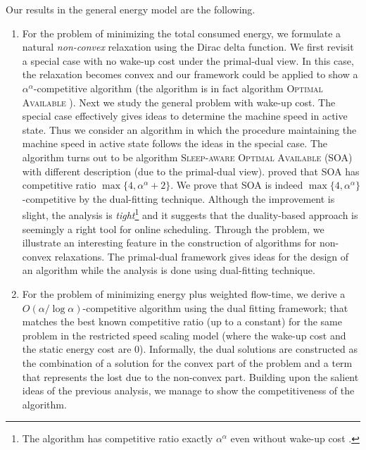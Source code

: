 \documentclass[11pt]{article}
\begin{document}
Our results in the general energy model are the following.


\begin{enumerate}
	\item For the problem of minimizing the total consumed energy,
	we formulate a natural \emph{non-convex} relaxation using the Dirac delta function. 
	We first revisit a special case with no wake-up cost under the primal-dual view. In this case,
	the relaxation becomes convex and our framework could be applied to show a
	$\alpha^{\alpha}$-competitive algorithm (the algorithm is in fact algorithm 
	\textsc{Optimal Available} \cite{YaoDemers95:A-Scheduling-Model}).
	Next we study the general problem with wake-up cost. 
	The special case effectively gives ideas to determine the machine speed in active state. 
	Thus we consider an algorithm in which the procedure maintaining the machine 
	speed in active state follows the ideas in the special case. The algorithm turns out to be algorithm 
	\textsc{Sleep-aware Optimal Available} (SOA) \cite{HanLam10:Deadline-scheduling} with different description 
	(due to the primal-dual view). \citet{HanLam10:Deadline-scheduling} proved that SOA has competitive ratio 
	$\max\{4,\alpha^{\alpha}+2\}$. We prove that SOA is indeed  
	$\max\{4,\alpha^{\alpha}\}$-competitive by the dual-fitting technique.
	Although the improvement is slight, the analysis is 
	\emph{tight}\footnote{The algorithm has competitive ratio exactly $\alpha^{\alpha}$
	even without wake-up cost \cite{BansalKimbrel07:Speed-scaling}.}
	and it suggests that the duality-based approach is seemingly a right tool for online scheduling. 
	Through the problem, we illustrate an interesting feature in the construction of  
	algorithms for non-convex relaxations. The primal-dual framework
	gives ideas for the design of an algorithm while the analysis is done using dual-fitting technique.     
\item For the problem of minimizing energy plus weighted flow-time, we derive a $O(\alpha/\log \alpha)$-competitive
	algorithm using the dual fitting framework; that matches the best known competitive ratio (up to a constant)
	for the same problem in the restricted speed scaling model 
	(where the wake-up cost and the static energy cost are 0). 
	Informally, the dual solutions are constructed as the combination of a solution 
	for the convex part of the problem and a term that represents the lost due to 
	the non-convex part. Building upon the salient ideas of the previous analysis,
	we manage to show the competitiveness of the algorithm. 
\end{enumerate}
\end{document}
